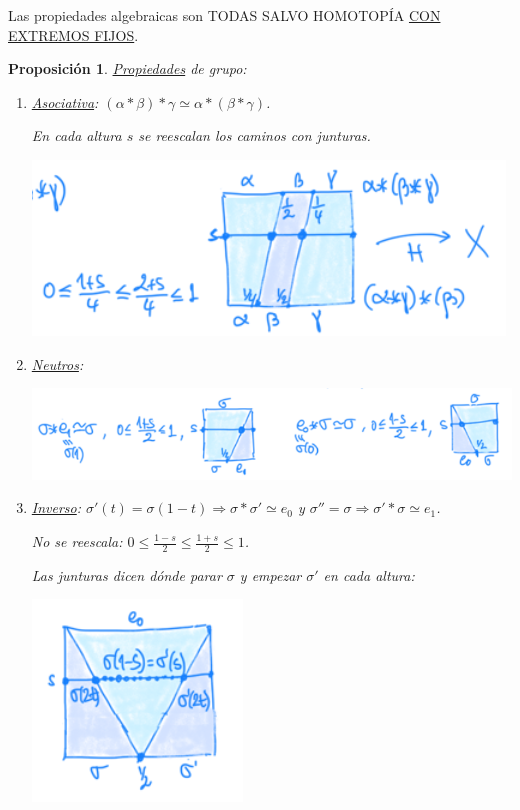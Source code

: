 \documentclass[10pt,a4paper,openright]{book}
\theoremstyle{break}
\newtheorem*{prop}{Proposición}
\begin{document}
Las propiedades algebraicas son TODAS SALVO HOMOTOPÍA \underline{CON EXTREMOS FIJOS}.
\begin{prop}
\underline{Propiedades} de grupo:
\begin{enumerate}
    \item \underline{Asociativa}: $\left( \alpha * \beta \right) * \gamma \simeq \alpha * \left( \beta * \gamma \right)$.

    En cada altura $s$ se reescalan los caminos con junturas.
    \begin{center}
        \includegraphics[scale=0.3]{images/asoc_gr_fund} 
    \end{center}
    \item \underline{Neutros}: 
    \begin{center}
        \includegraphics[scale=0.3]{images/neutro_gr_fund} 
    \end{center}
    \item \underline{Inverso}: $\sigma'\left( t \right) = \sigma\left( 1 - t \right) \Rightarrow \sigma * \sigma' \simeq e_0$ y $\sigma'' = \sigma \Rightarrow \sigma' * \sigma \simeq e_1$.

    No se reescala: $0 \le \frac{1 - s}{2} \le \frac{1 + s}{2} \le 1$. 

    Las junturas dicen dónde parar $\sigma$ y empezar $\sigma'$ en cada altura:
    \begin{center}
        \includegraphics[scale=0.3]{images/inv_gr_fund} 
    \end{center}


\end{enumerate}
\end{prop}
\end{document}
